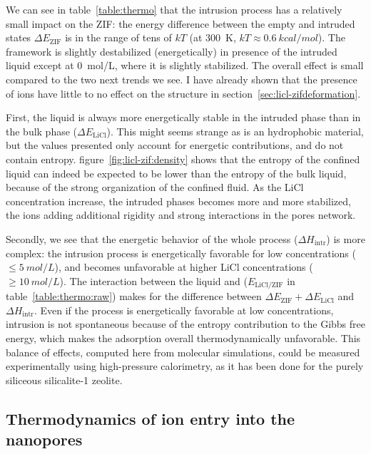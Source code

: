 \documentclass[thesis]{subfiles}
\begin{document}
We can see in table~\ref{table:thermo} that the intrusion process has a
relatively small impact on the ZIF: the energy difference between the empty and
intruded states $\Delta E_\text{ZIF}$ is in the range of tens of $kT$ (at \SI{300}{K},
$kT \approx \SI{0.6}{kcal/mol}$). The  framework is slightly destabilized
(energetically) in presence of the intruded liquid except at \SI{0}{mol/L},
where it is slightly stabilized. The overall effect is small compared to the two
next trends we see. I have already shown that the presence of ions have little
to no effect on the  structure in section~\ref{sec:licl-zifdeformation}.

First, the liquid is always more energetically stable in the intruded phase than
in the bulk phase ($\Delta E_\text{LiCl}$). This might seems strange as  is
an hydrophobic material, but the values presented only account for energetic
contributions, and do not contain entropy. figure~\ref{fig:licl-zif:density}
shows that the entropy of the confined liquid can indeed be expected to be lower
than the entropy of the bulk liquid, because of the strong organization of the
confined fluid. As the LiCl concentration increase, the intruded phases becomes
more and more stabilized, the ions adding additional rigidity and strong
interactions in the pores network.

Secondly, we see that the energetic behavior of the whole process ($\Delta
H_\text{intr}$) is more complex: the intrusion process is energetically
favorable for low concentrations ($\leq \SI{5}{mol/L}$), and becomes unfavorable
at higher LiCl concentrations ($\geq \SI{10}{mol/L}$). The interaction between
the liquid and  ($E_\text{LiCl/ZIF}$ in table~\ref{table:thermo:raw}) makes
for the difference between $\Delta E_\text{ZIF} + \Delta E_\text{LiCl}$ and
$\Delta H_\text{intr}$. Even if the process is energetically favorable at low
concentrations, intrusion is not spontaneous because of the entropy contribution
to the Gibbs free energy, which makes the adsorption overall thermodynamically
unfavorable. This balance of effects, computed here from molecular simulations,
could be measured experimentally using high-pressure calorimetry, as it has been
done for the purely siliceous silicalite-1 zeolite\cite{Karbowiak2009,
Karbowiak2010}.

\newpage
\subsection{Thermodynamics of ion entry into the nanopores}
\end{document}
